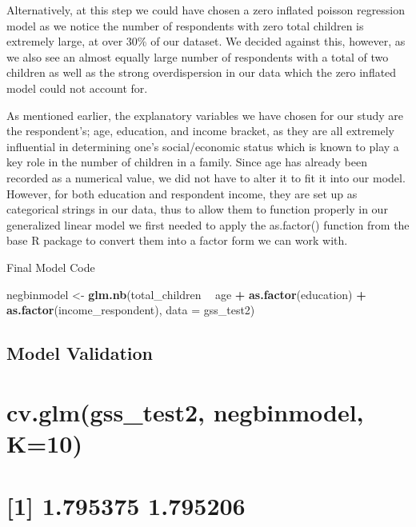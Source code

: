 \documentclass[
]{article}
\newenvironment{Shaded}{\begin{snugshade}}{\end{snugshade}}
\newcommand{\DataTypeTok}[1]{\textcolor[rgb]{0.13,0.29,0.53}{#1}}
\newcommand{\KeywordTok}[1]{\textcolor[rgb]{0.13,0.29,0.53}{\textbf{#1}}}
\newcommand{\NormalTok}[1]{#1}
\newcommand{\OperatorTok}[1]{\textcolor[rgb]{0.81,0.36,0.00}{\textbf{#1}}}
\newcommand{\StringTok}[1]{\textcolor[rgb]{0.31,0.60,0.02}{#1}}
\begin{document}
Alternatively, at this step we could have chosen a zero inflated poisson
regression model as we notice the number of respondents with zero total
children is extremely large, at over 30\% of our dataset. We decided
against this, however, as we also see an almost equally large number of
respondents with a total of two children as well as the strong
overdispersion in our data which the zero inflated model could not
account for.

As mentioned earlier, the explanatory variables we have chosen for our
study are the respondent's; age, education, and income bracket, as they
are all extremely influential in determining one's social/economic
status which is known to play a key role in the number of children in a
family. Since age has already been recorded as a numerical value, we did
not have to alter it to fit it into our model. However, for both
education and respondent income, they are set up as categorical strings
in our data, thus to allow them to function properly in our generalized
linear model we first needed to apply the as.factor() function from the
base R package to convert them into a factor form we can work with.

Final Model Code

\begin{Shaded}
\begin{Highlighting}[]
\NormalTok{negbinmodel <-}\StringTok{ }\KeywordTok{glm.nb}\NormalTok{(total_children }\OperatorTok{~}\StringTok{ }\NormalTok{age }\OperatorTok{+}\StringTok{ }
\StringTok{                        }\KeywordTok{as.factor}\NormalTok{(education) }\OperatorTok{+}\StringTok{ }
\StringTok{                        }\KeywordTok{as.factor}\NormalTok{(income_respondent), }
                      \DataTypeTok{data =}\NormalTok{ gss_test2)}
\end{Highlighting}
\end{Shaded}

\hypertarget{model-validation}{%
\subsection{Model Validation}\label{model-validation}}

\hypertarget{cv.glmgss_test2-negbinmodel-k10}{%
\section{cv.glm(gss\_test2, negbinmodel,
K=10)}\label{cv.glmgss_test2-negbinmodel-k10}}

\hypertarget{section}{%
\section{{[}1{]} 1.795375 1.795206}\label{section}}
\end{document}
